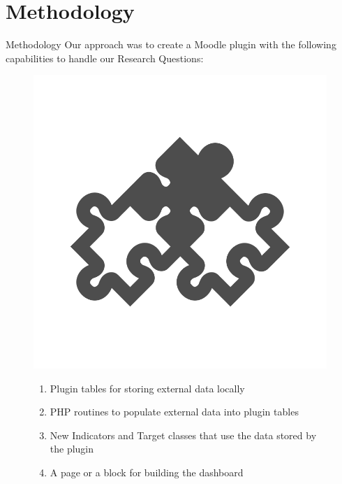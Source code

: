 \section{Methodology}

\begin{frame}{Methodology}
    Our approach was to create a Moodle plugin with the following capabilities to handle our Research Questions:

    \begin{figure}
        \centering
        \begin{minipage}{.3\textwidth}
          \centering
          \includegraphics[width=0.99\textwidth]{../../images/quebracabeca.png}
        \end{minipage}%
        \begin{minipage}{.7\textwidth}
            \begin{enumerate}
                \item Plugin tables for storing external data locally
                \item PHP routines to populate external data into plugin tables
                \item New Indicators and Target classes that use the data stored by the plugin
                \item A page or a block for building the dashboard
            \end{enumerate}
        \end{minipage}
    \end{figure}
\end{frame}

